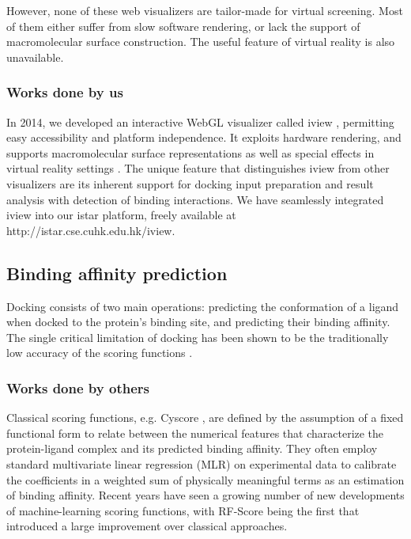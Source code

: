 \documentclass[a4paper,12pt]{article}
\begin{document}
However, none of these web visualizers are tailor-made for virtual screening. Most of them either suffer from slow software rendering, or lack the support of macromolecular surface construction. The useful feature of virtual reality is also unavailable.

\subsubsection*{Works done by us}

In 2014, we developed an interactive WebGL visualizer called iview \cite{1366}, permitting easy accessibility and platform independence. It exploits hardware rendering, and supports macromolecular surface representations as well as special effects in virtual reality settings \cite{1265}. The unique feature that distinguishes iview from other visualizers are its inherent support for docking input preparation and result analysis with detection of binding interactions. We have seamlessly integrated iview into our istar platform, freely available at http://istar.cse.cuhk.edu.hk/iview.

\subsection*{Binding affinity prediction}

Docking consists of two main operations: predicting the conformation of a ligand when docked to the protein's binding site, and predicting their binding affinity. The single critical limitation of docking has been shown to be the traditionally low accuracy of the scoring functions \cite{1362}.

\subsubsection*{Works done by others}

Classical scoring functions, e.g. Cyscore \cite{1372}, are defined by the assumption of a fixed functional form to relate between the numerical features that characterize the protein-ligand complex and its predicted binding affinity. They often employ standard multivariate linear regression (MLR) on experimental data to calibrate the coefficients in a weighted sum of physically meaningful terms as an estimation of binding affinity. Recent years have seen a growing number of new developments of machine-learning scoring functions, with RF-Score \cite{564} being the first that introduced a large improvement over classical approaches.
\end{document}
